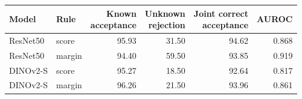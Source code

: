 \begin{tabular}{llrrrr}
\toprule
Model & Rule & \makecell{Known\\acceptance} & \makecell{Unknown\\rejection} & \makecell{Joint correct\\acceptance} & AUROC \\
\midrule
ResNet50 & score & 95.93 & 31.50 & 94.62 & 0.868 \\
ResNet50 & margin & 94.40 & 59.50 & 93.85 & 0.919 \\
DINOv2-S & score & 95.27 & 18.50 & 92.64 & 0.817 \\
DINOv2-S & margin & 96.26 & 21.50 & 93.96 & 0.861 \\
\bottomrule
\end{tabular}
